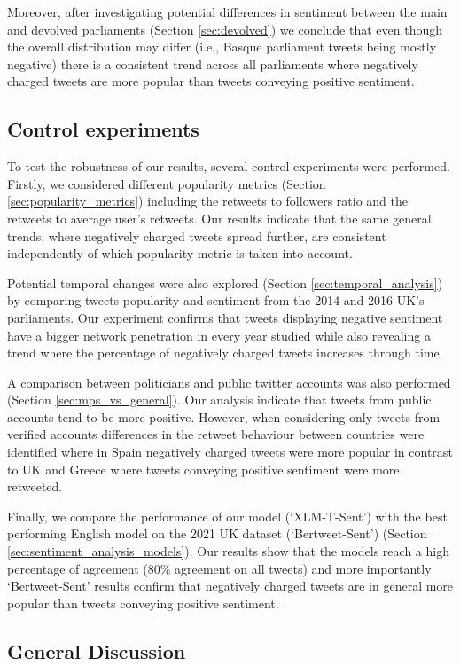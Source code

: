 Moreover, after investigating potential differences in sentiment between the main and devolved parliaments (Section \ref{sec:devolved}) we conclude that even though the overall distribution may differ (i.e., Basque parliament tweets being mostly negative) there is a consistent trend across all parliaments where negatively charged tweets are more popular than tweets conveying positive sentiment.

\subsection{Control experiments} 
\label{sec:controlsummary}
To test the robustness of our results, several control experiments were performed. Firstly, we considered different popularity metrics (Section \ref{sec:popularity_metrics}) including the retweets to followers ratio and the retweets to average user's retweets. Our results indicate that the same general trends, where negatively charged tweets spread further, are consistent independently of which popularity metric is taken into account. 

Potential temporal changes were also explored (Section \ref{sec:temporal_analysis}) by comparing tweets popularity and sentiment from the 2014 and 2016 UK's parliaments. Our experiment confirms that tweets displaying negative sentiment have a bigger network penetration in every year studied while also revealing a trend where the percentage of negatively charged tweets increases through time.

A comparison between  politicians and public twitter accounts was also performed (Section \ref{sec:mps_vs_general}). Our analysis indicate that tweets from public accounts tend to be more positive. However, when considering only tweets from verified accounts differences in the retweet behaviour between countries were identified where in Spain negatively charged tweets were more popular in contrast to UK and Greece where tweets conveying positive sentiment were more retweeted.

Finally, we compare the performance of our model (`XLM-T-Sent') with the best performing English model on the 2021 UK dataset (`Bertweet-Sent') (Section \ref{sec:sentiment_analysis_models}). Our results show that the models reach a high percentage of agreement (80\% agreement on all tweets) and more importantly `Bertweet-Sent' results confirm that negatively charged tweets are in general more popular than tweets conveying positive sentiment.

\subsection{General Discussion}
\label{sec:discussionsummary}

